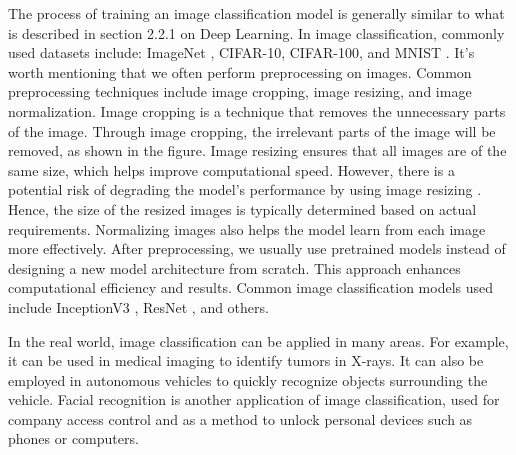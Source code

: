 \begin{ZhChapter}
    The process of training an image classification model is generally similar to what is described in section 2.2.1 on Deep Learning. In image classification, commonly used datasets include: ImageNet \cite{5206848}, CIFAR-10, CIFAR-100, and MNIST \cite{deng2012mnist}. It's worth mentioning that we often perform preprocessing on images. Common preprocessing techniques include image cropping, image resizing, and image normalization. Image cropping is a technique that removes the unnecessary parts of the image. Through image cropping, the irrelevant parts of the image will be removed, as shown in the figure. Image resizing ensures that all images are of the same size, which helps improve computational speed. However, there is a potential risk of degrading the model's performance by using image resizing \cite{relationshipBetweenImageSizeAndQuality}. Hence, the size of the resized images is typically determined based on actual requirements. Normalizing images also helps the model learn from each image more effectively. After preprocessing, we usually use pretrained models instead of designing a new model architecture from scratch. This approach enhances computational efficiency and results. Common image classification models used include InceptionV3 \cite{szegedy2015rethinkinginceptionarchitecturecomputer}, ResNet \cite{he2015deepresiduallearningimage}, and others.

    In the real world, image classification can be applied in many areas. For example, it can be used in medical imaging to identify tumors in X-rays. It can also be employed in autonomous vehicles to quickly recognize objects surrounding the vehicle. Facial recognition is another application of image classification, used for company access control and as a method to unlock personal devices such as phones or computers.



\end{ZhChapter}
